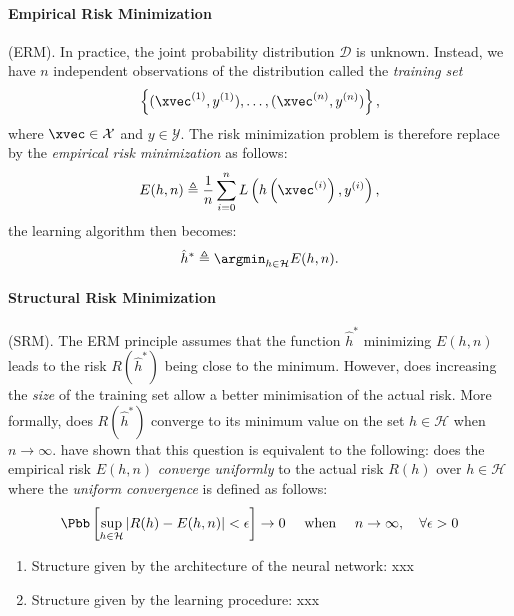 \paragraph{Empirical Risk Minimization} (ERM).
In practice, the joint probability distribution $\mathcal{D}$ is unknown.
Instead, we have $n$ independent observations of the distribution called the \emph{training set}
\begin{equation}
  \left\{ (\xvec^{(1)}, y^{(1)}), \dots, (\xvec^{(n)}, y^{(n)}) \right\} ,
\end{equation}
where $\xvec \in \mathcal{X}$ and $y \in \mathcal{Y}$.
The risk minimization problem is therefore replace by the \emph{empirical risk minimization} as follows:
\begin{equation}
  E(h, n) \triangleq \frac{1}{n} \sum_{i = 0}^{n} L\left(h\left(\xvec^{(i)}\right), y^{(i)}\right) ,
\end{equation}
the learning algorithm then becomes:
\begin{equation}
  \hat{h}^* \triangleq \argmin_{h \in \mathcal{H}} E(h, n)  .
\end{equation}


\paragraph{Structural Risk Minimization} (SRM).
The ERM principle assumes that the function $\hat{h}^*$ minimizing $E(h, n)$ leads to the risk $R(\hat{h}^*)$ being close to the minimum.
However, does increasing the \emph{size} of the training set allow a better minimisation of the actual risk. More formally, does $R(\hat{h}^*)$ converge to its minimum value on the set $h \in \mathcal{H}$ when $n \rightarrow \infty$. 
\citet{Vapnik1991TheNA} have shown that this question is equivalent to the following: does the empirical risk $E(h, n)$ \emph{converge uniformly} to the actual risk $R(h)$ over $h \in \mathcal{H}$ where the \emph{uniform convergence} is defined as follows:
\begin{equation}
  \Pbb \left[ \sup_{h \in \mathcal{H}} \left| R(h) - E(h, n) \right| < \epsilon \right] \rightarrow 0 \quad \text{ when } \quad n \rightarrow \infty, \quad \forall \epsilon > 0 
\end{equation}


\citet{vapnik1992principles} 


\begin{enumerate}
  \item Structure given by the architecture of the neural network: xxx
  \item Structure given by the learning procedure: xxx 
\end{enumerate}









